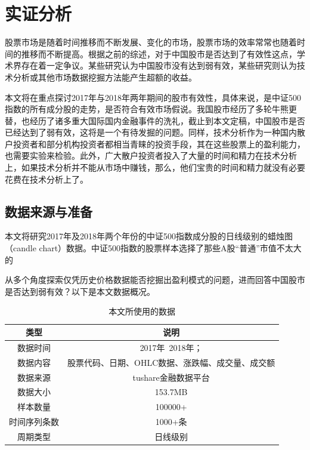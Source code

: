\documentclass[twoside,longtitle]{LZUthesis}
\begin{document}


\chapter{实证分析}
股票市场是随着时间推移而不断发展、变化的市场，股票市场的效率常常也随着时间的推移而不断提高。根据之前的综述，对于中国股市是否达到了有效性这点，学术界存在着一定争议。某些研究认为中国股市没有达到弱有效，某些研究则认为技术分析或其他市场数据挖掘方法能产生超额的收益。

本文将在重点探讨2017年与2018年两年期间的股市有效性，具体来说，是中证500指数的所有成分股的走势，是否符合有效市场假说。我国股市经历了多轮牛熊更替，也经历了诸多重大国际国内金融事件的洗礼，截止到本文定稿，中国股市是否已经达到了弱有效，这将是一个有待发掘的问题。同样，技术分析作为一种国内散户投资者和部分机构投资者都相当青睐的投资手段，其在这些股票上的盈利能力，也需要实验来检验。此外，广大散户投资者投入了大量的时间和精力在技术分析上，如果技术分析并不能从市场中赚钱，那么，他们宝贵的时间和精力就没有必要花费在技术分析上了。

\section{数据来源与准备}
本文将研究2017年及2018年两个年份的中证500指数成分股的日线级别的蜡烛图（candle chart）数据。中证500指数的股票样本选择了那些A股“普通”市值不太大的


从多个角度探索仅凭历史价格数据能否挖掘出盈利模式的问题，进而回答中国股市是否达到弱有效？以下是本文数据概况。
\begin{table}[H]
	\centering
	
\begin{tabular}{|c|c|}
	\hline
	类型 & 说明 \\
	\hline
	数据时间 &  2017年~2018年；\\
	\hline
	数据内容 &  股票代码、日期、OHLC数据、涨跌幅、成交量、成交额\\
	\hline
	数据来源 & tushare金融数据平台\cite{tushare} \\
	\hline
	数据大小 &  153.7MB\\
	\hline
	样本数量 & 100000+\\
	\hline
	时间序列条数 &  1000+条\\
	\hline
	周期类型 & 日线级别\\
	\hline
\end{tabular}
\caption{本文所使用的数据}
\end{table}
\end{document}
